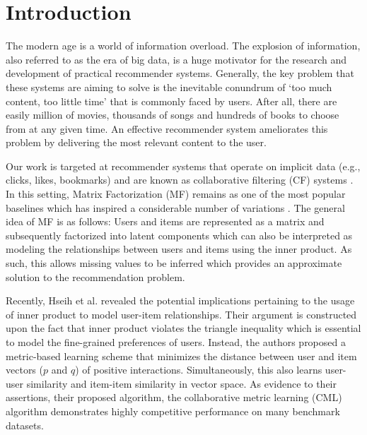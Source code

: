 \documentclass[sigconf]{acmart}
\begin{document}


\maketitle

\section{Introduction}

The modern age is a world of information overload. The explosion of information, also referred to as the era of big data, is a huge motivator for the research and development of practical recommender systems. Generally, the key problem that these systems are aiming to solve is the inevitable conundrum of `too much content, too little time' that is commonly faced by users. After all, there are easily million of movies, thousands of songs and hundreds of books to choose from at any given time. An effective recommender system ameliorates this problem by delivering the most relevant content to the user. 

Our work is targeted at recommender systems that operate on implicit data (e.g., clicks, likes, bookmarks) and are known as collaborative filtering (CF) systems \cite{DBLP:conf/www/SarwarKKR01}. In this setting, Matrix Factorization (MF) remains as one of the most popular baselines which has inspired a considerable number of variations \cite{DBLP:conf/sigir/HeZKC16,DBLP:conf/uai/RendleFGS09,He:2017:NCF:3038912.3052569,DBLP:conf/kdd/Koren08}. The general idea of MF is as follows: Users and items are represented as a matrix and subsequently factorized into latent components which can also be interpreted as modeling the relationships between users and items using the inner product. As such, this allows missing values to be inferred which provides an approximate solution to the recommendation problem.

Recently, Hseih et al. \cite{DBLP:conf/www/HsiehYCLBE17} revealed the potential implications pertaining to the usage of inner product to model user-item relationships. Their argument is constructed upon the fact that inner product violates the triangle inequality which is essential to model the fine-grained preferences of users. Instead, the authors proposed a metric-based learning scheme that minimizes the distance between user and item vectors ($p$ and $q$) of positive interactions. Simultaneously, this also learns user-user similarity and item-item similarity in vector space. As evidence to their assertions, their proposed algorithm, the collaborative metric learning (CML) algorithm \cite{DBLP:conf/www/HsiehYCLBE17} demonstrates highly competitive performance on many benchmark datasets. 
\end{document}
